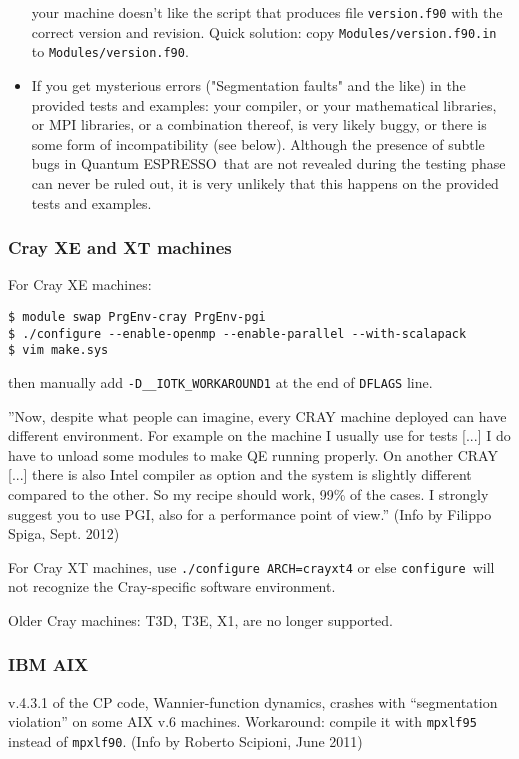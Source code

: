 \documentclass[12pt,a4paper]{article}
\def\qe{{\sc Quantum ESPRESSO}}
\def\configure{\texttt{configure}}
\begin{document}
\begin{itemize}
your machine doesn't like the script that produces file \texttt{version.f90}
with the correct version and revision. Quick solution: copy 
\texttt{Modules/version.f90.in} to \texttt{Modules/version.f90}.
\item
If you get mysterious errors ("Segmentation faults" and the like) 
in the provided tests and examples:
your compiler, or your mathematical libraries, or MPI libraries,
or a combination thereof, is very likely buggy, or there is some
form of incompatibility (see below). Although the 
presence of subtle bugs in \qe\ that are not revealed during 
the testing phase can never be ruled out, it is very unlikely
that this happens on the provided tests and examples. 
\end{itemize}

\subsubsection{Cray XE and XT machines}

For Cray XE machines:
\begin{verbatim}
$ module swap PrgEnv-cray PrgEnv-pgi
$ ./configure --enable-openmp --enable-parallel --with-scalapack
$ vim make.sys
\end{verbatim}
then manually add \texttt{-D\_\_IOTK\_WORKAROUND1} at the end of \texttt{DFLAGS} line.

''Now, despite what people can imagine, every CRAY machine deployed can
have different environment. For example on the machine I usually use 
for tests [...] I do have to unload some modules to make QE running 
properly. On another CRAY [...] there is also Intel compiler as option
and the system is slightly different compared to the other. 
So my recipe should work, 99\% of the cases.
I strongly suggest you to use PGI, also for a performance point of view.''
(Info by Filippo Spiga, Sept. 2012)

For Cray XT machines, use \texttt{./configure ARCH=crayxt4} or else 
\configure\ will not recognize the Cray-specific software environment. 

Older Cray machines: T3D, T3E, X1, are no longer supported.

\subsubsection{IBM AIX}

v.4.3.1 of the CP code, Wannier-function dynamics, crashes with
``segmentation violation'' on some AIX v.6 machines.
Workaround: compile it with \texttt{mpxlf95} instead of 
\texttt{mpxlf90}. (Info by Roberto Scipioni, June 2011)
\end{document}
